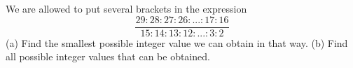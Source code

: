 We are allowed to put several brackets in the expression
$$\frac{29 : 28 : 27 : 26 :... : 17 : 16}{15 : 14 : 13 : 12 : ... : 3 : 2}$$(a) Find the smallest possible integer value we can obtain in that way.
(b) Find all possible integer values that can be obtained.